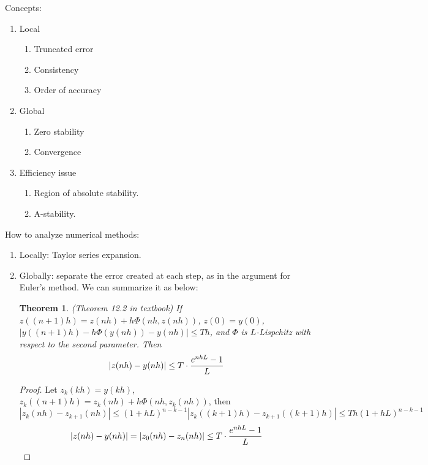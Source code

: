 \documentclass{article} %
\theoremstyle{break}
\newtheorem{thm}[definition]{Theorem}
\begin{document}
Concepts:
\begin{enumerate}
\item Local
  \begin{enumerate}
    \item Truncated error
    \item Consistency
    \item Order of accuracy
  \end{enumerate}
\item Global
  \begin{enumerate}
   \item Zero stability
   \item Convergence
  \end{enumerate}
\item Efficiency issue
  \begin{enumerate}
   \item Region of absolute stability.
   \item A-stability.
  \end{enumerate}
\end{enumerate}


How to analyze numerical methods:

\begin{enumerate}
\item Locally: Taylor series expansion.
\item Globally: separate the error created at each step, as in the argument for Euler's method. We can summarize it as below:
  \begin{thm}\label{global}(Theorem 12.2 in textbook)
    If $z((n+1)h)=z(nh)+h\Phi(nh, z(nh))$, $z(0)=y(0)$, $|y((n+1)h)-h\Phi(y(nh))-y(nh)|\leq Th$, and $\Phi$ is $L$-Lispchitz with respect to the second parameter. Then
    \[|z(nh)-y(nh)|\leq T\cdot {e^{nhL}-1\over L}\]
 \end{thm}
 \begin{proof}
   Let $z_k(kh)=y(kh)$, $z_k((n+1)h)=z_k(nh)+h\Phi(nh, z_k(nh))$, then
   \[|z_k(nh)-z_{k+1}(nh)|\leq (1+hL)^{n-k-1}|z_k((k+1)h)-z_{k+1}((k+1)h)|\leq Th(1+hL)^{n-k-1}\]
   \[|z(nh)-y(nh)|=|z_0(nh)-z_n(nh)|\leq T\cdot {e^{nhL}-1\over L}\]
 \end{proof}
\end{enumerate}
\end{document}
